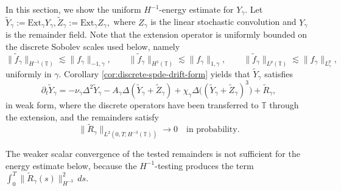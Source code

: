 \documentclass{article}
\begin{document}
In this section, we show the uniform \(H^{-1}\)-energy estimate for \(Y_\gamma\).
Let
\(
\widetilde Y_\gamma:=\mathrm{Ext}_\gamma Y_\gamma,
\widetilde Z_\gamma:=\mathrm{Ext}_\gamma Z_\gamma,
\)
where \(Z_\gamma\) is the linear stochastic convolution and
\(Y_\gamma\) is the remainder field.
Note that the extension operator is uniformly bounded on the discrete Sobolev scales used below, namely
\[
\|\widetilde f_\gamma\|_{H^{-1}(\mathbb T)}
\lesssim
\|f_\gamma\|_{-1,\gamma},
\qquad
\|\widetilde f_\gamma\|_{H^{1}(\mathbb T)}
\lesssim
\|f_\gamma\|_{1,\gamma},
\qquad
\|\widetilde f_\gamma\|_{L^p(\mathbb T)}
\lesssim
\|f_\gamma\|_{L^p_\gamma},
\]
uniformly in \(\gamma\). 
Corollary \ref{cor:discrete-spde-drift-form} yields that \(\widetilde Y_\gamma\) satisfies
\begin{equation}\label{E:disCH}
    \partial_t \widetilde Y_\gamma =
-\nu_{\gamma }\Delta^2 \widetilde Y_\gamma
- A_\gamma\Delta(\widetilde Y_\gamma+\widetilde Z_\gamma)
+ \chi_{\gamma}\Delta\bigl((\widetilde Y_\gamma+\widetilde Z_\gamma)^3\bigr) + \widetilde R_\gamma,
\end{equation}
in weak form, where the discrete operators have been transferred to \(\mathbb T\) through the extension, and the remainders satisfy
 \begin{equation}\label{E:energy-remainder-control}
\|\widetilde R_\gamma\|_{L^2(0,T;H^{-3}(\mathbb T))}
\longrightarrow 0
\quad\text{in probability}.
\end{equation}

The weaker scalar convergence of the tested remainders is not sufficient for the
energy estimate below, because the \(H^{-1}\)-testing produces the term
\(\int_0^T\|\widetilde R_\gamma(s)\|_{H^{-3}}^2\,ds\).
\end{document}
